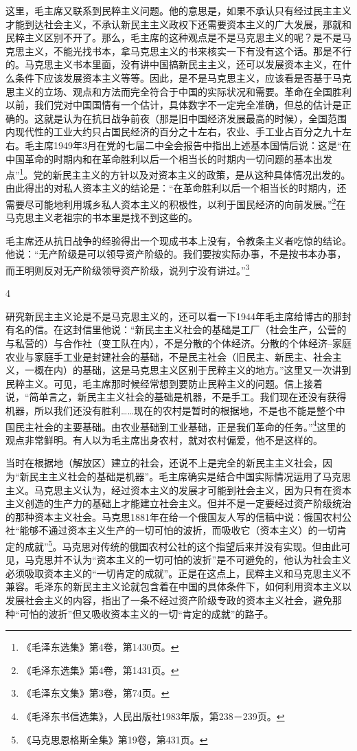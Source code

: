 \documentclass[UTF8, 12pt, a4paper]{ctexrep}
\begin{document}
这里，毛主席又联系到民粹主义问题。他的意思是，如果不承认只有经过民主主义才能到达社会主义，不承认新民主主义政权下还需要资本主义的广大发展，那就和民粹主义区别不开了。那么，毛主席的这种观点是不是马克思主义的呢？是不是马克思主义，不能光找书本，拿马克思主义的书来核实一下有没有这个话。那是不行的。马克思主义书本里面，没有讲中国搞新民主主义，还可以发展资本主义，在什么条件下应该发展资本主义等等。因此，是不是马克思主义，应该看是否基于马克思主义的立场、观点和方法而完全符合于中国的实际状况和需要。革命在全国胜利以前，我们党对中国国情有一个估计，具体数字不一定完全准确，但总的估计是正确的。这就是认为在抗日战争前夜（那是旧中国经济发展最高的时候），全国范围内现代性的工业大约只占国民经济的百分之十左右，农业、手工业占百分之九十左右。毛主席1949年3月在党的七届二中全会报告中指出上述基本国情后说：这是“在中国革命的时期内和在革命胜利以后一个相当长的时期内一切问题的基本出发点”\footnote{《毛泽东选集》第4卷，第1430页。}。党的新民主主义的方针以及对资本主义的政策，是从这种具体情况出发的。由此得出的对私人资本主义的结论是：“在革命胜利以后一个相当长的时期内，还需要尽可能地利用城乡私人资本主义的积极性，以利于国民经济的向前发展。”\footnote{《毛泽东选集》第4卷，第1431页。}在马克思主义老祖宗的书本里是找不到这些的。

毛主席还从抗日战争的经验得出一个现成书本上没有，令教条主义者吃惊的结论。他说：“无产阶级是可以领导资产阶级的。我们要按实际办事，不是按书本办事，而王明则反对无产阶级领导资产阶级，说列宁没有讲过。”\footnote{《毛泽东文集》第3卷，第74页。}

4

研究新民主主义论是不是马克思主义的，还可以看一下1944年毛主席给博古的那封有名的信。在这封信里他说：“新民主主义社会的基础是工厂（社会生产，公营的与私营的）与合作社（变工队在内），不是分散的个体经济。分散的个体经济--家庭农业与家庭手工业是封建社会的基础，不是民主社会（旧民主、新民主、社会主义，一概在内）的基础，这是马克思主义区别于民粹主义的地方。”这里又一次讲到民粹主义。可见，毛主席那时候经常想到要防止民粹主义的问题。信上接着说，“简单言之，新民主主义社会的基础是机器，不是手工。我们现在还没有获得机器，所以我们还没有胜利……现在的农村是暂时的根据地，不是也不能是整个中国民主社会的主要基础。由农业基础到工业基础，正是我们革命的任务。”\footnote{《毛泽东书信选集》，人民出版社1983年版，第238－239页。}这里的观点非常鲜明。有人以为毛主席出身农村，就对农村偏爱，他不是这样的。

当时在根据地（解放区）建立的社会，还说不上是完全的新民主主义社会，因为“新民主主义社会的基础是机器”。毛主席确实是结合中国实际情况运用了马克思主义。马克思主义认为，经过资本主义的发展才可能到社会主义，因为只有在资本主义创造的生产力的基础上才能建立社会主义。但并不是一定要经过资产阶级统治的那种资本主义社会。马克思1881年在给一个俄国友人写的信稿中说：俄国农村公社“能够不通过资本主义生产的一切可怕的波折，而吸收它（资本主义）的一切肯定的成就”\footnote{《马克思恩格斯全集》第19卷，第431页。}。马克思对传统的俄国农村公社的这个指望后来并没有实现。但由此可见，马克思并不认为“资本主义的一切可怕的波折”是不可避免的，他认为社会主义必须吸取资本主义的“一切肯定的成就”。正是在这点上，民粹主义和马克思主义不兼容。毛泽东的新民主主义论就包含着在中国的具体条件下，如何利用资本主义以发展社会主义的内容，指出了一条不经过资产阶级专政的资本主义社会，避免那种“可怕的波折”但又吸收资本主义的一切“肯定的成就”的路子。
\end{document}
